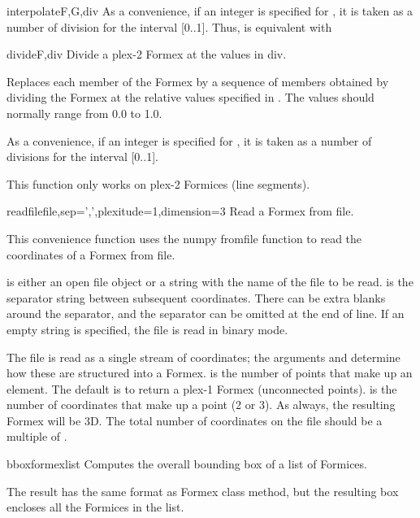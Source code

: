 {{\begin{funcdesc}{interpolate}{F,G,div}
As a convenience, if an integer is specified for , it is taken as a
number of division for the interval [0..1].
Thus,  is equivalent with
\end{funcdesc}


\begin{funcdesc}{divide}{F,div}
Divide a plex-2 Formex at the values in div.

Replaces each member of the Formex  by a sequence of members obtained
by dividing the Formex at the relative values specified in . The values
should normally range from 0.0 to 1.0.
    
As a convenience, if an integer is specified for , it is taken as a
number of divisions for the interval [0..1].

This function only works on plex-2 Formices (line segments).
\end{funcdesc}


\begin{funcdesc}{readfile}{file,sep=',',plexitude=1,dimension=3}
Read a Formex from file.

This convenience function uses the numpy fromfile function to read the coordinates of a Formex from file. 

 is either an open file object or a string with the name of the file to be read.
 is the separator string between subsequent coordinates. There can be extra blanks around the separator, and the separator can be omitted at the end of line. If an empty string is specified, the file is read in binary mode.

The file is read as a single stream of coordinates; the arguments  and  determine how these are structured into a Formex.
 is the number of points that make up an element. The default is to return a plex-1 Formex (unconnected points).
 is the number of coordinates that make up a point (2 or 3). As always, the resulting Formex will be 3D.
The total number of coordinates on the file should be a multiple of .
\end{funcdesc}


\begin{funcdesc}{bbox}{formexlist}
Computes the overall bounding box of a list of Formices.

The result has the same format as Formex class  method, but the resulting box encloses all the Formices in the list.
\end{funcdesc}



}}
